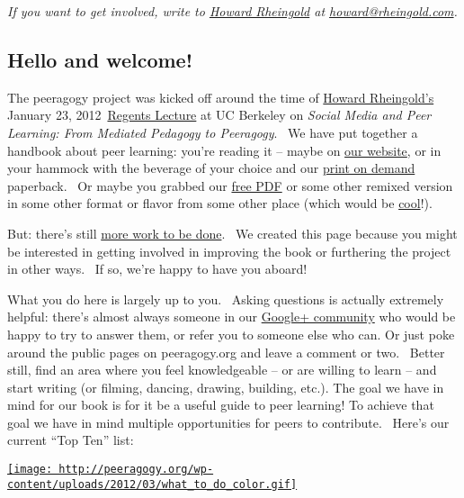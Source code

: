 \emph{If you want to get involved, write to
\href{http://en.wikipedia.org/wiki/Howard_Rheingold}{Howard Rheingold}
at \href{mailto:howard@rheingold.com}{howard@rheingold.com}.}

\subsection{Hello and welcome!}

The peeragogy project was kicked off around the time of
\href{http://rheingold.com/}{Howard Rheingold's} January 23,
2012~\href{http://vimeo.com/35685124}{Regents Lecture} at UC Berkeley on
\emph{Social Media and Peer Learning: From Mediated Pedagogy to
Peeragogy}.~ We have put together a handbook about peer learning: you're
reading it -- maybe on \href{peeragogy.org}{our website}, or in your
hammock with the beverage of your choice and our
\href{http://www.lulu.com/shop/howard-rheingold-and-peeragogyorg-editors/the-peeragogy-handbook/paperback/product-20607425.html}{print
on demand} paperback.~ Or maybe you grabbed our
\href{http://peeragogy.net/peeragogy-handbook-v1-1.pdf}{free PDF} or
some other remixed version in some other format or flavor from some
other place (which would be
\href{http://peeragogy.org/resources/license/}{cool}!).

But: there's still
\href{http://peeragogy.org/peeragogy-org-roadmap/}{more work to be
done}.~ We created this page because you might be interested in getting
involved in improving the book or furthering the project in other ways.~
If so, we're happy to have you aboard!

What you do here is largely up to you.~ Asking questions is actually
extremely helpful: there's almost always someone in our
\href{https://plus.google.com/u/0/communities/107386162349686249470}{Google+
community} who would be happy to try to answer them, or refer you to
someone else who can. Or just poke around the public pages on
peeragogy.org and leave a comment or two.~ Better still, find an area
where you feel knowledgeable -- or are willing to learn -- and start
writing (or filming, dancing, drawing, building, etc.).
The goal we have in mind for our book is for it be a useful guide to
peer learning! To achieve that goal we have in mind multiple
opportunities for peers to contribute.~ Here's our current ``Top Ten''
list:

\href{http://peeragogy.org/wp-content/uploads/2012/03/what_to_do_color.gif}{\texttt{[image: http://peeragogy.org/wp-content/uploads/2012/03/what\_to\_do\_color.gif]}}

